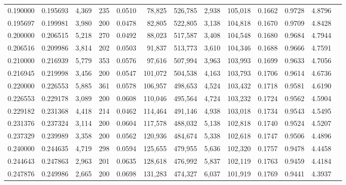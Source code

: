 \begin{tabular}{rrrrrrrrrrrrr}
0.190000 & 0.195693 & 4,369 & 235 &                                     0.0510 &  78,825 & 526,785 &   2,938 & 105,018 & 0.1662 & 0.9728 & 4.8796 \\
0.195697 & 0.199981 & 3,980 & 200 &                                     0.0478 &  82,805 & 522,805 &   3,138 & 104,818 & 0.1670 & 0.9709 & 4.8428 \\
0.200000 & 0.206515 & 5,218 & 270 &                                     0.0492 &  88,023 & 517,587 &   3,408 & 104,548 & 0.1680 & 0.9684 & 4.7944 \\
0.206516 & 0.209986 & 3,814 & 202 &                                     0.0503 &  91,837 & 513,773 &   3,610 & 104,346 & 0.1688 & 0.9666 & 4.7591 \\
0.210000 & 0.216939 & 5,779 & 353 &                                     0.0576 &  97,616 & 507,994 &   3,963 & 103,993 & 0.1699 & 0.9633 & 4.7056 \\
0.216945 & 0.219998 & 3,456 & 200 &                                     0.0547 & 101,072 & 504,538 &   4,163 & 103,793 & 0.1706 & 0.9614 & 4.6736 \\
0.220000 & 0.226553 & 5,885 & 361 &                                     0.0578 & 106,957 & 498,653 &   4,524 & 103,432 & 0.1718 & 0.9581 & 4.6190 \\
0.226553 & 0.229178 & 3,089 & 200 &                                     0.0608 & 110,046 & 495,564 &   4,724 & 103,232 & 0.1724 & 0.9562 & 4.5904 \\
0.229182 & 0.231368 & 4,418 & 214 &                                     0.0462 & 114,464 & 491,146 &   4,938 & 103,018 & 0.1734 & 0.9543 & 4.5495 \\
0.231376 & 0.237324 & 3,114 & 200 &                                     0.0604 & 117,578 & 488,032 &   5,138 & 102,818 & 0.1740 & 0.9524 & 4.5207 \\
0.237329 & 0.239989 & 3,358 & 200 &                                     0.0562 & 120,936 & 484,674 &   5,338 & 102,618 & 0.1747 & 0.9506 & 4.4896 \\
0.240000 & 0.244635 & 4,719 & 298 &                                     0.0594 & 125,655 & 479,955 &   5,636 & 102,320 & 0.1757 & 0.9478 & 4.4458 \\
0.244643 & 0.247863 & 2,963 & 201 &                                     0.0635 & 128,618 & 476,992 &   5,837 & 102,119 & 0.1763 & 0.9459 & 4.4184 \\
0.247876 & 0.249986 & 2,665 & 200 &                                     0.0698 & 131,283 & 474,327 &   6,037 & 101,919 & 0.1769 & 0.9441 & 4.3937 \\

\end{tabular}
